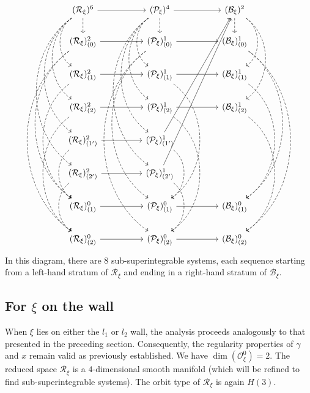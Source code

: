 \documentclass[12pt]{amsart}
\theoremstyle{definition}
\numberwithin{equation}{section}
\newcommand{\Oxi}{\mathcal{O}_{\xi}}
\newcommand{\Reducedxi}{\mathcal{R}_\xi}
\newcommand{\Pxi}{\mathcal{P}_{\xi}}
\newcommand{\Bxi}{\mathcal{B}_{\xi}}
\begin{document}
  
\begin{equation}
	\label{Diagram:SU3arrowsabcrefined}
	\begin{tikzcd}
		(\Reducedxi)^6  \arrow[ddddd,bend right=55,dashed] \arrow[dddd,bend right=55,dashed]\arrow[ddd,bend right=55,dashed]\arrow[dd,bend right=55,dashed]\arrow[d,dashed] \arrow[rr] && (\Pxi)^4   \arrow[ddddd,bend right=55,dashed] \arrow[dddd,bend right=55,dashed]\arrow[ddd,bend right=55,dashed]\arrow[dd,bend right=55,dashed]\arrow[d,dashed] \arrow[rr]   && (\Bxi)^2    \arrow[d,dashed] \arrow[dd,bend left=55,dashed]\arrow[ddd,bend left=55,dashed] \\
		(\Reducedxi)^2_{(0)}  
 \arrow[ddddd,bend right=55,dashed] 
\arrow[dddddd,bend right=55,dashed]\arrow[rr ] && (\Pxi)^1_{(0)} \arrow[ddddd,bend right=55,dashed] 
\arrow[dddddd,bend right=55,dashed] \arrow[rr ]&& (\Bxi)^1_{(0)}   \arrow[ddddd,bend left=55,dashed]\arrow[dddddd,bend left=55,dashed]\\  
		(\Reducedxi)^2_{(1)}  
 \arrow[dddd,bend right=55,dashed] \arrow[rr ] && (\Pxi)^1_{(1)} \arrow[dddd,bend left=55,dashed] \arrow[rr ]  && (\Bxi)^1_{(1)}   \arrow[dddd,bend left=55,dashed]\\  
		(\Reducedxi)^2_{(2)}  
 \arrow[dddd,bend right=55,dashed] 
 \arrow[rr ] && (\Pxi)^1_{(2)} \arrow[dddd,bend left=55,dashed] \arrow[rr ]  && (\Bxi)^1_{(2)}   \arrow[dddd,bend left=55,dashed]\\
       (\Reducedxi)^2_{(1')}  
 \arrow[dd,bend right=55,dashed] \arrow[rr ] && (\Pxi)^1_{(1')} \arrow[dd,bend left=55,dashed] \arrow[rruuuu ]  &&  ~\\  
       (\Reducedxi)^2_{(2')}  
 \arrow[dd,bend right=55,dashed]  \arrow[rr ] && (\Pxi)^1_{(2')} \arrow[dd,bend left=55,dashed] \arrow[rruuuuu ]  && ~\\  
		(\Reducedxi)^0_{(1)}   \arrow[rr ] && (\Pxi)^0_{(1)}  \arrow[rr ]  && (\Bxi)^0_{(1)}    \\
		(\Reducedxi)^0_{(2)}  \arrow[rr ] && (\Pxi)^0_{(2)}  \arrow[rr ]  && (\Bxi)^0_{(2)}     
	\end{tikzcd}
\end{equation}
 In this diagram, there are 8 sub-superintegrable systems, each   sequence starting from a left-hand stratum of $\Reducedxi  $ and ending in a right-hand stratum of $\Bxi $.

  
    
\subsection{For   $\xi  $   on the wall}\label{subSec:rankone} 
When $\xi$ lies on either the ${l_1}$ or ${l_2}$ wall, the analysis proceeds analogously to that presented in the preceding section. Consequently, the regularity properties of $\gamma$ and $x$ remain valid as previously established. We have $\dim(\Oxi^0) = 2$. The reduced space $\Reducedxi $ is a $4$-dimensional smooth manifold (which will be refined to find sub-superintegrable systems).  The orbit type of $ \Reducedxi$ is again $H(3)$.
\end{document}
